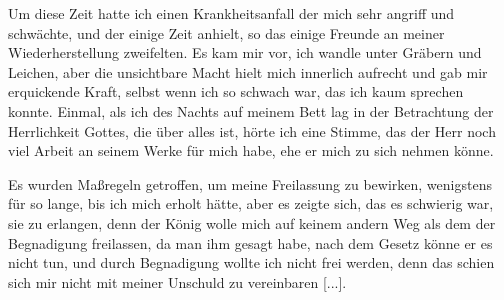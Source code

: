 Um diese Zeit hatte ich einen Krankheitsanfall der mich sehr
angriff und schwächte, und der einige Zeit anhielt, so das einige
Freunde an meiner Wiederherstellung zweifelten. Es kam mir
vor, ich wandle unter Gräbern und Leichen, aber die unsichtbare
Macht hielt mich innerlich aufrecht und gab mir erquickende Kraft,
selbst wenn ich so schwach war, das ich kaum sprechen konnte.
Einmal, als ich des Nachts auf meinem Bett lag in der Betrachtung 
der Herrlichkeit Gottes, die über alles ist, hörte ich
eine Stimme, das der Herr noch viel Arbeit an seinem Werke für
mich habe, ehe er mich zu sich nehmen könne.

Es wurden Maßregeln getroffen, um meine Freilassung zu
bewirken, wenigstens für so lange, bis ich mich erholt hätte, aber
es zeigte sich, das es schwierig war, sie zu erlangen, denn der
König wolle mich auf keinem andern Weg als dem der Begnadigung
freilassen, da man ihm gesagt habe, nach dem Gesetz
könne er es nicht tun, und durch Begnadigung wollte ich nicht
frei werden, denn das schien sich mir nicht mit meiner Unschuld
zu vereinbaren [...].

